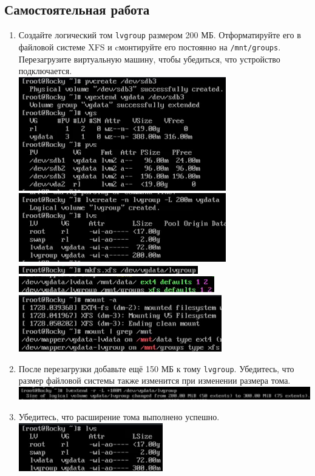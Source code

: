 \documentclass[12pt]{article}
\begin{document}
\subsection{Самостоятельная работа}
\begin{enumerate}
	\item Создайте логический том \texttt{lvgroup} размером 200 МБ. Отформатируйте его в
	      файловой системе XFS и cмонтируйте его постоянно на \texttt{/mnt/groups}. Перезагрузите
	      виртуальную машину, чтобы убедиться, что устройство подключается.
	      \\\includegraphics{14.png}
	      \\\includegraphics{15.png}
	      \\\includegraphics{16.png}
	      \\\includegraphics{17.png}
	      \\\includegraphics{18.png}
	\item После перезагрузки добавьте ещё 150 МБ к тому \texttt{lvgroup}. Убедитесь, что размер
	      файловой системы также изменится при изменении размера тома.
	      \\\includegraphics{19.png}
	\item Убедитесь, что расширение тома выполнено успешно.
	      \\\includegraphics{20.png}
\end{enumerate}
\end{document}
